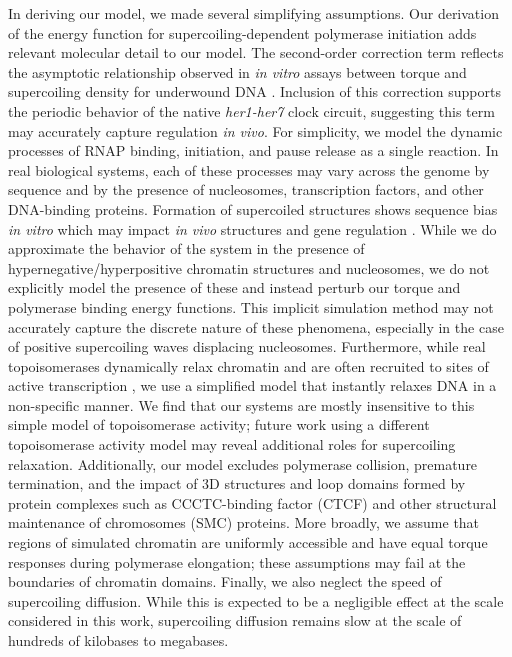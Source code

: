 \documentclass[11pt]{article} %
\begin{document}
In deriving our model, we made several simplifying assumptions. Our derivation of the energy function for supercoiling-dependent polymerase initiation adds relevant molecular detail to our model. The second-order correction term reflects the asymptotic relationship observed in \textit{in vitro}  assays between torque and supercoiling density for underwound DNA \parencite{leSynergisticCoordinationChromatin2019}. Inclusion of this correction supports the periodic behavior of the native \emph{her1-her7} clock circuit, suggesting this term may accurately capture regulation \textit{in vivo}. For simplicity, we model the dynamic processes of RNAP binding, initiation, and pause release as a single reaction. In real biological systems, each of these processes may vary across the genome by sequence and by the presence of nucleosomes, transcription factors, and other DNA-binding proteins. Formation of supercoiled structures shows sequence bias \textit{in vitro} which may impact \textit{in vivo} structures and gene regulation \parencite{kimDNASequenceEncodes2018}.  While we do approximate the behavior of the system in the presence of hypernegative/hyperpositive chromatin structures and nucleosomes, we do not explicitly model the presence of these and instead perturb our torque and polymerase binding energy functions. This implicit simulation method may not accurately capture the discrete nature of these phenomena, especially in the case of positive supercoiling waves displacing nucleosomes. Furthermore, while real topoisomerases dynamically relax chromatin and are often recruited to sites of active transcription \parencite{baranelloRNAPolymeraseII2016}, we use a simplified model that instantly relaxes DNA in a non-specific manner. We find that our systems are mostly insensitive to this simple model of topoisomerase activity; future work using a different topoisomerase activity model may reveal additional roles for supercoiling relaxation. Additionally, our model excludes polymerase collision, premature termination, and the impact of 3D structures and loop domains formed by protein complexes such as CCCTC-binding factor (CTCF) and other structural maintenance of chromosomes (SMC) proteins. More broadly, we assume that regions of simulated chromatin are uniformly accessible and have equal torque responses during polymerase elongation; these assumptions may fail at the boundaries of chromatin domains. Finally, we also neglect the speed of supercoiling diffusion. While this is expected to be a negligible effect at the scale considered in this work, supercoiling diffusion remains slow at the scale of hundreds of kilobases to megabases.
\end{document}
